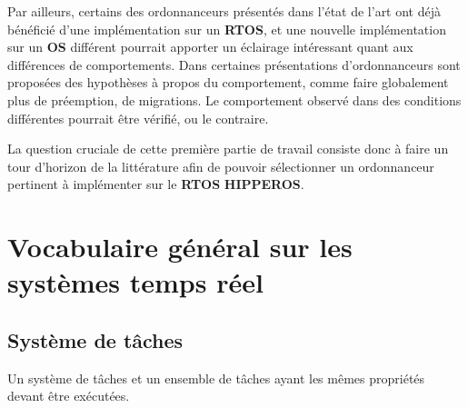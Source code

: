 \documentclass[11pt,a4paper,oneside]{report}
\begin{document}
Par ailleurs, certains des ordonnanceurs présentés dans l'état de l'art 
 ont déjà bénéficié d'une implémentation sur un \textbf{RTOS}, et une nouvelle 
 implémentation sur un \textbf{OS} différent pourrait apporter un éclairage intéressant quant 
 aux différences de comportements.
Dans certaines présentations d'ordonnanceurs sont proposées des hypothèses à propos du comportement, 
comme faire globalement plus de préemption, de migrations. 
Le comportement observé dans des conditions différentes pourrait être vérifié, ou le contraire.

La question cruciale de cette première partie de travail 
consiste donc à faire un tour d'horizon de la littérature afin de pouvoir 
sélectionner un ordonnanceur pertinent à implémenter sur le \textbf{RTOS} \textbf{HIPPEROS}.

\section{Vocabulaire général sur les systèmes temps réel}

\subsection{Système de tâches}
Un système de tâches et un ensemble de tâches ayant les mêmes propriétés devant être exécutées. 
\end{document}
